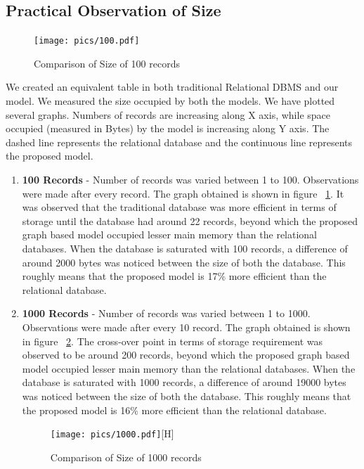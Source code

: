 \documentclass[12pt, oneside]{book}
\begin{document}
\subsection{Practical Observation of Size}
\begin{figure}[ht]
  \centering
   \texttt{[image: pics/100.pdf]}
   \caption{Comparison of Size of 100 records}
   \label{fig:100result}
\end{figure}
We created an equivalent table in both traditional Relational DBMS and our model. We measured the size occupied by both the models. We have plotted several graphs. Numbers of records are increasing along X axis, while space occupied (measured in Bytes) by the model is increasing along Y axis. The dashed line represents the relational database and the continuous line represents the proposed model.
\begin{enumerate}
 \item \textbf{100 Records} - Number of records was varied between 1 to 100. Observations were made after every record. The graph obtained is shown in figure ~\ref{fig:100result}. It was observed that the traditional database was more efficient in terms of storage until the database had around 22 records, beyond which the proposed graph based model occupied lesser main memory than the relational databases. When the database is saturated with 100 records, a difference of around 2000 bytes was noticed between the size of both the database. This roughly means that the proposed model is 17\% more efficient than the relational database.
  \item \textbf{1000 Records} - Number of records was varied between 1 to 1000. Observations were made after every 10 record. The graph obtained is shown in figure ~\ref{fig:1000result}. The cross-over point in terms of storage requirement was observed to be around 200 records, beyond which the proposed graph based model occupied lesser main memory than the relational databases. When the database is saturated with 1000 records, a difference of around 19000 bytes was noticed between the size of both the database. This roughly means that the proposed model is 16\% more efficient than the relational database.
 \begin{figure}[H]
  \begin{center}
   \texttt{[image: pics/1000.pdf]}[H]
   \caption{Comparison of Size of 1000 records}
   \label{fig:1000result}
  \end{center}
 \end{figure}

\end{enumerate}
\end{document}
